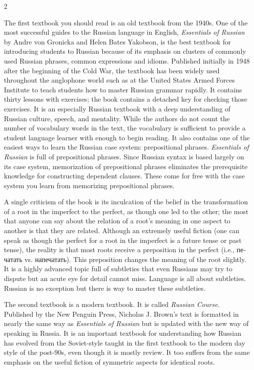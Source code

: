 \documentclass[10pt,a4paper,twoside]{article} %
\begin{document}
\begin{multicols}{2}
{\newline \indent The first textbook you should read is an old textbook from the 1940s. One of the most successful guides to the Russian language in English, \emph{Essentials of Russian} by Andre von Gronicka and Helen Bates Yakobson, is the best textbook for introducing students to Russian because of its emphasis on clusters of commonly used Russian phrases, common expressions and idioms. Published initially in 1948 after the beginning of the Cold War, the textbook has been widely used throughout the anglophone world such as at the United States Armed Forces Institute to teach students how to master Russian grammar rapidly. It contains thirty lessons with exercises; the book contains a detached key for checking those exercises. It is an especially Russian textbook with a deep understanding of Russian culture, speech, and mentality. While the authors do not count the number of vocabulary words in the text, the vocabulary is sufficient to provide a student language learner with enough to begin reading. It also contains one of the easiest ways to learn the Russian case system: prepositional phrases. \emph{Essentials of Russian} is full of prepositional phrases.  Since Russian syntax is based largely on its case system, memorization of prepositional phrases eliminates the prerequisite knowledge for constructing dependent clauses. These come for free with the case system you learn from memorizing prepositional phrases. 

\newline \indent A single criticism of the book is its inculcation of the belief in the transformation of a root in the imperfect to the perfect, as though one led to the other; the most that anyone can say about the relation of a root’s meaning in one aspect to another is that they are related. Although an extremely useful fiction (one can speak as though the perfect for a root in the imperfect is a future tense or past tense), the reality is that most roots receive a preposition in the perfect (i.e., \textrussian{печатать} vs. \textrussian{напечатать}). This preposition changes the meaning of the root slightly. It is a highly advanced topic full of subtleties that even Russians may try to dispute but an acute eye for detail cannot miss. Language is all about subtleties. Russian is no exception but there is way to master these subtleties. 

\newline \indent The second textbook is a modern textbook. It is called \emph{Russian Course}. Published by the New Penguin Press, Nicholas J. Brown’s text is formatted in nearly the same way as \emph{Essentials of Russian} but is updated with the new way of speaking in Russia. It is an important textbook for understanding how Russian has evolved from the Soviet-style taught in the first textbook to the modern day style of the post-90s, even though it is mostly review. It too suffers from the same emphasis on the useful fiction of symmetric aspects for identical roots. 

}
\end{multicols}
\end{document}
